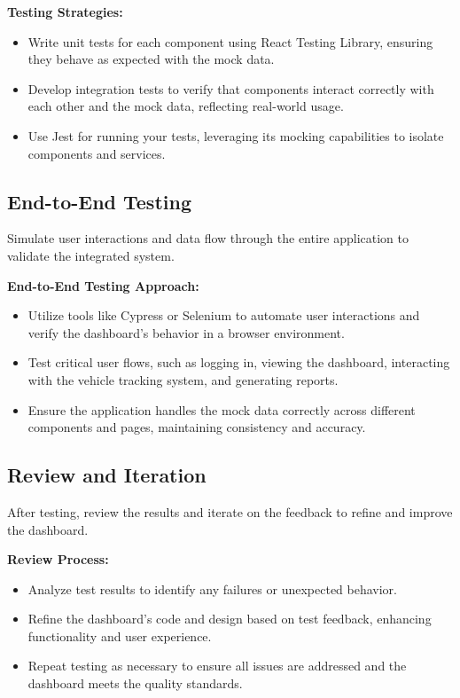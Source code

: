 \textbf{Testing Strategies:}
\begin{itemize}
    \item Write unit tests for each component using React Testing Library, ensuring they behave as expected with the mock data.
    \item Develop integration tests to verify that components interact correctly with each other and the mock data, reflecting real-world usage.
    \item Use Jest for running your tests, leveraging its mocking capabilities to isolate components and services.
\end{itemize}

\subsection*{End-to-End Testing}
Simulate user interactions and data flow through the entire application to validate the integrated system.

\textbf{End-to-End Testing Approach:}
\begin{itemize}
    \item Utilize tools like Cypress or Selenium to automate user interactions and verify the dashboard's behavior in a browser environment.
    \item Test critical user flows, such as logging in, viewing the dashboard, interacting with the vehicle tracking system, and generating reports.
    \item Ensure the application handles the mock data correctly across different components and pages, maintaining consistency and accuracy.
\end{itemize}

\subsection*{Review and Iteration}
After testing, review the results and iterate on the feedback to refine and improve the dashboard.

\textbf{Review Process:}
\begin{itemize}
    \item Analyze test results to identify any failures or unexpected behavior.
    \item Refine the dashboard's code and design based on test feedback, enhancing functionality and user experience.
    \item Repeat testing as necessary to ensure all issues are addressed and the dashboard meets the quality standards.
\end{itemize}

